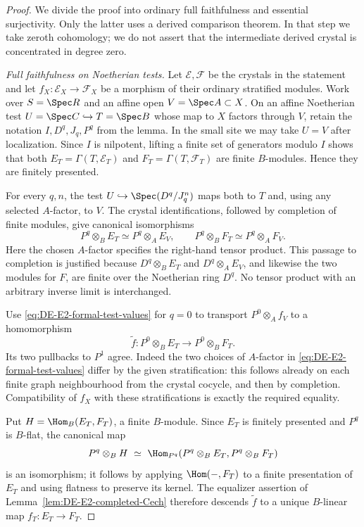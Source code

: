 \begin{proof}
We divide the proof into ordinary full faithfulness and essential surjectivity.  Only the latter uses a derived comparison theorem.  In that step we take zeroth cohomology; we do not assert that the intermediate derived crystal is concentrated in degree zero.

\emph{Full faithfulness on Noetherian tests.}
Let $\mathcal E,\mathcal F$ be the crystals in the statement and let
$f_X:\mathcal E_X\to\mathcal F_X$ be a morphism of their ordinary stratified modules.  Work over $S=\Spec R$ and an affine open $V=\Spec A\subset X$.  On an affine Noetherian test $U=\Spec C\hookrightarrow T=\Spec B$ whose map to $X$ factors through $V$, retain the notation $I,D^q,J_q,P^q$ from the lemma.  In the small site we may take $U=V$ after localization.  Since $I$ is nilpotent, lifting a finite set of generators modulo $I$ shows that both $E_T=\Gamma(T,\mathcal E_T)$ and $F_T=\Gamma(T,\mathcal F_T)$ are finite $B$-modules.  Hence they are finitely presented.

For every $q,n$, the test $U\hookrightarrow\Spec(D^q/J_q^n)$ maps both to $T$ and, using any selected $A$-factor, to $V$.  The crystal identifications, followed by completion of finite modules, give canonical isomorphisms
\begin{equation}\label{eq:DE-E2-formal-test-values}
 P^q\otimes_BE_T\simeq P^q\otimes_AE_V,\qquad
 P^q\otimes_BF_T\simeq P^q\otimes_AF_V.
\end{equation}
Here the chosen $A$-factor specifies the right-hand tensor product.  This passage to completion is justified because $D^q\otimes_BE_T$ and $D^q\otimes_AE_V$, and likewise the two modules for $F$, are finite over the Noetherian ring $D^q$.  No tensor product with an arbitrary inverse limit is interchanged.

Use \eqref{eq:DE-E2-formal-test-values} for $q=0$ to transport $P^0\otimes_Af_V$ to a homomorphism
\[
                 \widetilde f:P^0\otimes_BE_T\longrightarrow P^0\otimes_BF_T.
\]
Its two pullbacks to $P^1$ agree.  Indeed the two choices of $A$-factor in \eqref{eq:DE-E2-formal-test-values} differ by the given stratification: this follows already on each finite graph neighbourhood from the crystal cocycle, and then by completion.  Compatibility of $f_X$ with these stratifications is exactly the required equality.

Put $H=\Hom_B(E_T,F_T)$, a finite $B$-module.  Since $E_T$ is finitely presented and $P^q$ is $B$-flat, the canonical map
\[
 P^q\otimes_BH\ \simeq\
 \Hom_{P^q}(P^q\otimes_BE_T,P^q\otimes_BF_T)
\]
is an isomorphism; it follows by applying $\Hom(-,F_T)$ to a finite presentation of $E_T$ and using flatness to preserve its kernel.  The equalizer assertion of Lemma~\ref{lem:DE-E2-completed-Cech} therefore descends $\widetilde f$ to a unique $B$-linear map $f_T:E_T\to F_T$.


\end{proof}
